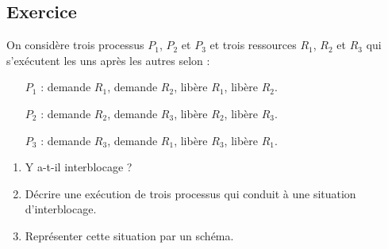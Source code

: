 \documentclass[11pt,a4paper]{article}
\newcounter{numexo}
\begin{document}
\addtocounter{numexo}{1}
\subsection*{\Large Exercice \thenumexo}
On considère trois processus $P_1$, $P_2$ et $P_3$ et trois ressources $R_1$, $R_2$ et $R_3$ qui s'exécutent les uns après les autres selon :
\begin{itemize}
\item[$P_1$]: demande $R_1$, demande $R_2$, libère $R_1$, libère $R_2$.
\item[$P_2$]: demande $R_2$, demande $R_3$, libère $R_2$, libère $R_3$.
\item[$P_3$]: demande $R_3$, demande $R_1$, libère $R_3$, libère $R_1$.
\end{itemize}
\begin{enumerate}
\item Y a-t-il interblocage ?
\item Décrire une exécution de trois processus qui conduit à une situation d'interblocage.
\item Représenter cette situation par un schéma.
\end{enumerate}
\end{document}
